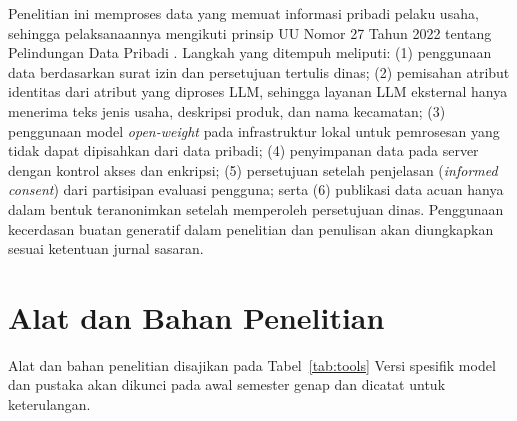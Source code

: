 \documentclass[12pt,a4paper]{report}
\begin{document}
Penelitian ini memproses data yang memuat informasi pribadi pelaku usaha, sehingga pelaksanaannya mengikuti prinsip UU Nomor 27 Tahun 2022 tentang Pelindungan Data Pribadi \cite{uupdp2022}. Langkah yang ditempuh meliputi: (1) penggunaan data berdasarkan surat izin dan persetujuan tertulis dinas; (2) pemisahan atribut identitas dari atribut yang diproses LLM, sehingga layanan LLM eksternal hanya menerima teks jenis usaha, deskripsi produk, dan nama kecamatan; (3) penggunaan model \textit{open-weight} pada infrastruktur lokal untuk pemrosesan yang tidak dapat dipisahkan dari data pribadi; (4) penyimpanan data pada server dengan kontrol akses dan enkripsi; (5) persetujuan setelah penjelasan (\textit{informed consent}) dari partisipan evaluasi pengguna; serta (6) publikasi data acuan hanya dalam bentuk teranonimkan setelah memperoleh persetujuan dinas. Penggunaan kecerdasan buatan generatif dalam penelitian dan penulisan akan diungkapkan sesuai ketentuan jurnal sasaran.

\section{Alat dan Bahan Penelitian}
\label{sec:alat}

Alat dan bahan penelitian disajikan pada Tabel~\ref{tab:tools} Versi spesifik model dan pustaka akan dikunci pada awal semester genap dan dicatat untuk keterulangan.
\end{document}
